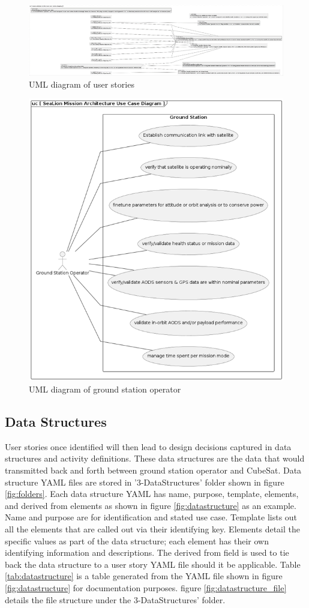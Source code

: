 \documentclass[journal,article,submit,pdftex,moreauthors]{Definitions/mdpi}
\begin{document}
\begin{figure}[H]
    \includegraphics[width=10.5 cm]{assets/uml_userstory.png}
    \caption{UML diagram of user stories}
	\label{fig:uml_userstory}
    \end{figure}   
\unskip

\begin{figure}[H]
    \includegraphics[width=10.5 cm]{assets/uml_userstory2.png}
    \caption{UML diagram of ground station operator}
	\label{fig:uml_userstory2}
    \end{figure}   
\unskip

\subsection{Data Structures}
User stories once identified will then lead to design decisions captured in data structures and activity definitions.  These data structures are the data that would transmitted back and forth between ground station operator and CubeSat.  Data structure YAML files are stored in '3-DataStructures' folder shown in figure \ref{fig:folders}.  Each data structure YAML has name, purpose, template, elements, and derived from elements as shown in figure \ref{fig:datastructure} as an example.  Name and purpose are for identification and stated use case.  Template lists out all the elements that are called out via their identifying key.  Elements detail the specific values as part of the data structure; each element has their own identifying information and descriptions.  The derived from field is used to tie back the data structure to a user story YAML file should it be applicable.  Table \ref{tab:datastructure} is a table generated from the YAML file shown in figure \ref{fig:datastructure} for documentation purposes.  figure \ref{fig:datastructure_file} details the file structure under the 3-DataStructures' folder.
\end{document}
